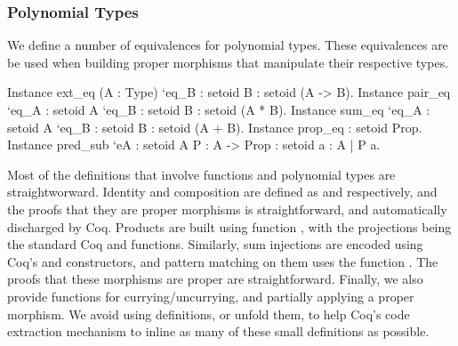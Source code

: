 \documentclass[anonymous, a4paper, UKenglish, cleveref, autoref, thm-restate]{lipics-v2021}
\begin{document}
\subsubsection{Polynomial Types}
We define a number of equivalences for polynomial types. These equivalences are
be used when building proper morphisms that manipulate their respective types.
\begin{coqcode}
Instance ext_eq (A : Type) `{eq_B : setoid B} : setoid (A -> B).
Instance pair_eq `{eq_A : setoid A} `{eq_B : setoid B} : setoid (A * B).
Instance sum_eq `{eq_A : setoid A} `{eq_B : setoid B} : setoid (A + B).
Instance prop_eq : setoid Prop.
Instance pred_sub `{eA : setoid A} {P : A -> Prop} : setoid {a : A | P a}.
\end{coqcode}

Most of the definitions that involve functions and polynomial types are
straightworward.  Identity and composition are defined as 
 and  
respectively, and the proofs that they are proper morphisms is straightforward,
and automatically discharged by Coq. 
Products are built using function ,
with the projections being the standard Coq   and
 functions. Similarly, sum injections are encoded using
Coq's  and  constructors, and
pattern matching on them uses the function 
.
The proofs that these morphisms are proper are straightforward.  Finally, we
also provide functions for currying/uncurrying, and partially applying a proper
morphism. We avoid using definitions, or unfold them, to help Coq's code
extraction mechanism to inline as many of these small definitions as possible.
\end{document}

